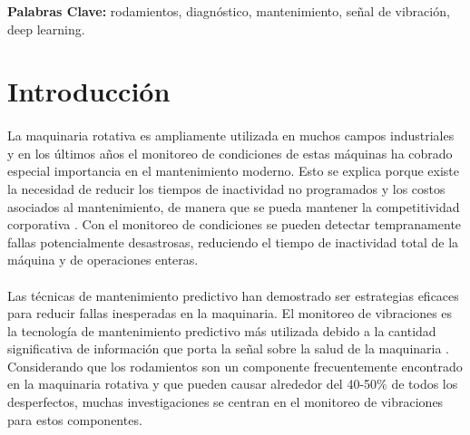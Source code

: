 \documentclass[12pt]{article}%
\begin{document}
\noindent
\textbf{Palabras Clave:} rodamientos, diagnóstico, mantenimiento, señal de vibración, deep learning.


\newpage
\renewcommand{\contentsname}{Índice}
\tableofcontents
\renewcommand{\figurename}{Figura}
\renewcommand{\refname}{Referencias}
\renewcommand{\listtablename}{Lista de Tablas}
\newpage



\renewcommand{\listfigurename}{Lista de Figuras}
\listoffigures
\listoftables
\newpage


\section{Introducción}

\paragraph{}
La maquinaria rotativa es ampliamente utilizada en muchos campos industriales y en los últimos años el monitoreo de condiciones de estas máquinas ha cobrado especial importancia en el mantenimiento moderno. Esto se explica porque existe la necesidad de reducir los tiempos de inactividad no programados y los costos asociados al mantenimiento, de manera que se pueda mantener la competitividad corporativa \cite{seeraa}. Con el monitoreo de condiciones se pueden detectar tempranamente fallas potencialmente desastrosas, reduciendo el tiempo de inactividad total de la máquina y de operaciones enteras.

\paragraph{}
Las técnicas de mantenimiento predictivo han demostrado ser estrategias eficaces para reducir fallas inesperadas en la maquinaria. El monitoreo de vibraciones es la tecnología de mantenimiento predictivo más utilizada debido a la cantidad significativa de información que porta la señal sobre la salud de la maquinaria \cite{zhan}. Considerando que los rodamientos son un componente frecuentemente encontrado en la maquinaria rotativa y que pueden causar alrededor del 40-50\% \cite{issam} de todos los desperfectos, muchas investigaciones se centran en el monitoreo de vibraciones para estos componentes.
\end{document}
